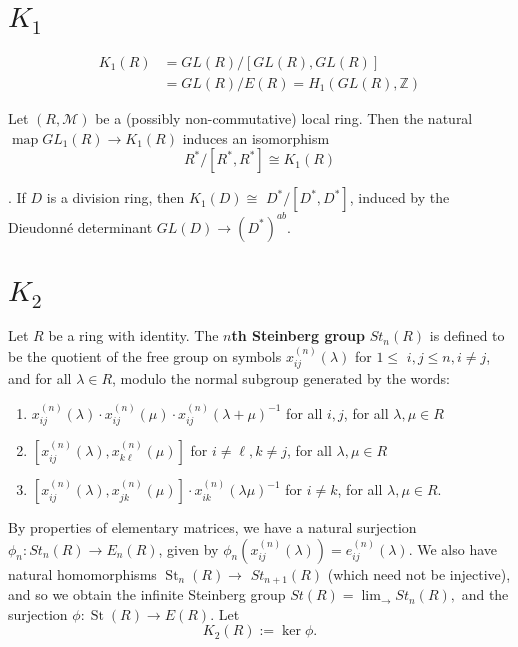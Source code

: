 \section{$K_1$}


$$\begin{aligned} K_1(R) & =G L(R) /[G L(R), G L(R)] \\ & =G L(R) / E(R)=H_1(G L(R), \mathbb{Z})\end{aligned}$$


\begin{prop}
Let $(R, \mathcal{M})$ be a (possibly non-commutative) local ring. Then the natural $\operatorname{map} G L_1(R) \rightarrow K_1(R)$ induces an isomorphism
    $$
    R^* /\left[R^*, R^*\right] \cong K_1(R)
    $$    
\end{prop}

\begin{coro}
[Dieudonné]. If $D$ is a division ring, then $K_1(D) \cong$ $D^* /\left[D^*, D^*\right]$, induced by the Dieudonné determinant $G L(D) \rightarrow\left(D^*\right)^{a b}$.    
\end{coro}



\section{$K_2$}

Let $R$ be a ring with identity. The \textbf{$n$th Steinberg group} $S t_n(R)$ is defined to be the quotient of the free group on symbols $x_{i j}^{(n)}(\lambda)$ for $1 \leq$ $i, j \leq n, i \neq j$, and for all $\lambda \in R$, modulo the normal subgroup generated by the words:
\begin{enumerate}
    \item $x_{i j}^{(n)}(\lambda) \cdot x_{i j}^{(n)}(\mu) \cdot x_{i j}^{(n)}(\lambda+\mu)^{-1}$ for all $i, j$, for all $\lambda, \mu \in R$
    \item $\left[x_{i j}^{(n)}(\lambda), x_{k \ell}^{(n)}(\mu)\right]$ for $i \neq \ell, k \neq j$, for all $\lambda, \mu \in R$
    \item $\left[x_{i j}^{(n)}(\lambda), x_{j k}^{(n)}(\mu)\right] \cdot x_{i k}^{(n)}(\lambda \mu)^{-1}$ for $i \neq k$, for all $\lambda, \mu \in R$.
\end{enumerate} %

By properties of elementary matrices, we have a natural surjection $\phi_n: S t_n(R) \rightarrow E_n(R)$, given by $\phi_n\left(x_{i j}^{(n)}(\lambda)\right)=e_{i j}^{(n)}(\lambda)$. We also have natural homomorphisms $\operatorname{St}_n(R) \rightarrow$ $S t_{n+1}(R)$ (which need not be injective), and so we obtain the infinite Steinberg group
$
S t(R)=\lim _{\rightarrow} S t_n(R),
$
and the surjection $\phi: \operatorname{St}(R) \longrightarrow E(R)$. Let $$K_2(R):=\ker \phi.$$

